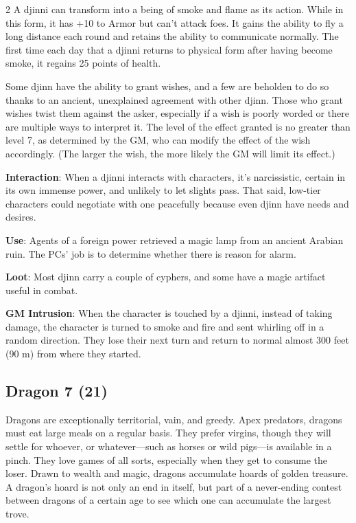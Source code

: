 \begin{multicols}{2}
A djinni can transform into a being of smoke and flame as its action. While in this form, it has +10 to Armor but can’t attack foes. It gains the ability to fly a long distance each round and retains the ability to communicate normally. The first time each day that a djinni returns to physical form after having become smoke, it regains 25 points of health.

Some djinn have the ability to grant wishes, and a few are beholden to do so thanks to an ancient, unexplained agreement with other djinn. Those who grant wishes twist them against the asker, especially if a wish is poorly worded or there are multiple ways to interpret it. The level of the effect granted is no greater than level 7, as determined by the GM, who can modify the effect of the wish accordingly. (The larger the wish, the more likely the GM will limit its effect.) 

\textbf{Interaction}: When a djinni interacts with characters, it’s narcissistic, certain in its own immense power, and unlikely to let slights pass. That said, low-tier characters could negotiate with one peacefully because even djinn have needs and desires.

\textbf{Use}: Agents of a foreign power retrieved a magic lamp from an ancient Arabian ruin. The PCs’ job is to determine whether there is reason for alarm.

\textbf{Loot}: Most djinn carry a couple of cyphers, and some have a magic artifact useful in combat.

\textbf{GM Intrusion}: When the character is touched by a djinni, instead of taking damage, the character is turned to smoke and fire and sent whirling off in a random direction. They lose their next turn and return to normal almost 300 feet (90 m) from where they started.

\subsection{Dragon	7 (21)}

Dragons are exceptionally territorial, vain, and greedy. Apex predators, dragons must eat large meals on a regular basis. They prefer virgins, though they will settle for whoever, or whatever—such as horses or wild pigs—is available in a pinch. They love games of all sorts, especially when they get to consume the loser. Drawn to wealth and magic, dragons accumulate hoards of golden treasure. A dragon’s hoard is not only an end in itself, but part of a never-ending contest between dragons of a certain age to see which one can accumulate the largest trove. 



\end{multicols}
